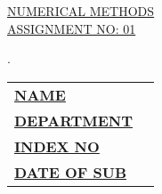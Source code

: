 \documentclass[12pt,a4paper]{article}
\begin{document}
\begin{titlepage}
	
	\begin{flushright}
	\end{flushright}
	
	\vspace*{\fill}
	\begin{center}
		\uppercase{\fontsize{30}{45}\selectfont \ul{Numerical Methods}}\\
		\uppercase{\fontsize{20}{30}\selectfont \ul{Assignment No: 01}}
	\end{center}
	\vfill %
	\begin{multicols}{2}
        .\\
		
		\columnbreak	
		\begin{tabular}{ll}
			\vspace{6pt}
			
			\textbf{\uppercase{\underline{Name}}}       &
			\textbf{\uppercase{\fontsize{12}{18} \selectfont {:}}} 
			{\fontsize{12}{18} \selectfont {Gnanakeethan B}}      \\
			
			\vspace{6pt}
			\textbf{\uppercase{\underline{Department}}} &
			\textbf{\uppercase{\fontsize{12}{18} \selectfont {:}}} 
			{\fontsize{12}{18} \selectfont {Engineering Tech.}}\\
			
			\vspace{6pt}
			\textbf{\uppercase{\underline{Index No}}}   &
			\textbf{\uppercase{\fontsize{12}{18} \selectfont {:}}} 
			{\fontsize{12}{18} \selectfont {EGT/16/00037}}  \\

			\vspace{6pt}
			\textbf{\uppercase{\underline{Date of Sub}}}   &
			\textbf{\uppercase{\fontsize{12}{18} \selectfont {:}}} 
			{\fontsize{12}{18} \selectfont {14/12/2018}}  \\

			
			
		\end{tabular}
	\end{multicols}
	
\end{titlepage}
\end{document}
